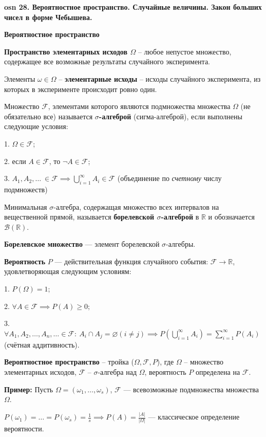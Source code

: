 \textbf{\LARGE osn 28. Вероятностное пространство. Случайные величины. Закон больших чисел в форме Чебышева.}

\centerline{\textbf{Вероятностное пространство}}

\textbf{Пространство элементарных исходов $\Omega$} -- любое непустое множество, содержащее все возможные результаты случайного эксперимента.

Элементы $\omega \in \Omega$ -- \textbf{элементарные исходы} -- исходы случайного эксперимента, из которых в эксперименте происходит ровно один. 

Множество $\mathcal{F}$, элементами которого являются подмножества множества $\Omega$ (не обязательно все) называется \textbf{$\sigma$-алгеброй} (сигма-алгеброй), если выполнены следующие условия:

1. $\Omega \in \mathcal{F}$;

2. если $A \in \mathcal{F}$, то $\neg A \in \mathcal{F}$;

3. $A_1,A_2,\dots~\in \mathcal{F} \implies \bigcup_{i=1}^{\infty} A_i \in \mathcal{F}$ (объединение по \textit{счетному} числу подмножеств)


Минимальная $\sigma$-алгебра, содержащая множество всех интервалов на вещественной прямой, называется \textbf{борелевской $\sigma$-алгеброй} в $\mathbb{R}$ и обозначается $\mathcal{B}(\mathbb{R})$. 

\textbf{Борелевское множество} --- элемент борелевской $\sigma$-алгебры.

\textbf{Вероятность} $P$ --- действительная функция случайного события: $\mathcal{F} \rightarrow \mathbb{R}$, удовлетворяющая следующим условиям:

1. $P(\Omega) = 1$;

2.  $\forall A \in \mathcal{F}\implies P(A) \geqslant 0$;

3. $\forall A_1,A_2,\dots,A_n,\dots \in \mathcal{F}:~A_i \cap A_j = \varnothing (i \neq j) \implies P(\displaystyle\bigcup_{i=1}^{\infty}A_i) = \displaystyle\sum_{i=1}^{\infty}P(A_i)$ (счётная аддитивность).


\textbf{Вероятностное пространство} -- тройка ($\Omega, \mathcal{F}, P$), где $\Omega$ -- множество элементарных исходов, $\mathcal{F}$ -- $\sigma$-алгебра над $\Omega$, вероятность $P$ определена на $\mathcal{F}$.

\textbf{Пример: }
Пусть $\Omega = (\omega_1,\dots,\omega_s)$, $\mathcal{F}$ --- всевозможные подмножества множества $\Omega$.

$P(\omega_1) = \dots = P(\omega_s) = \frac{1}{s} \implies P(A) = \frac{|A|}{|\Omega|}$ --- классическое определение вероятности.


